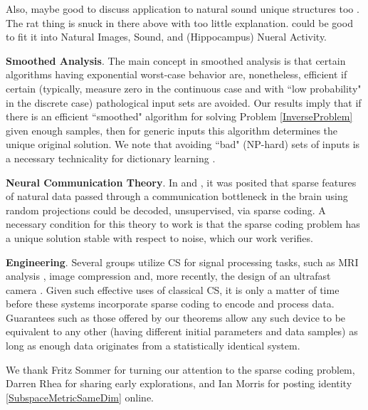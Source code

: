 \documentclass[journal, twocolumn]{IEEEtran}
\begin{document}
Also, maybe good to discuss application to natural sound unique structures too \cite{bellsejnowski1996, smithlewicki2006, Carlson12}.
The rat thing is snuck in there above with too little explanation.  could be good to fit it into Natural Images, Sound, and (Hippocampus) Nueral Activity.

\textbf{Smoothed Analysis}.
The main concept in smoothed analysis \cite{Spielman04} is that certain algorithms having exponential worst-case behavior are, nonetheless, efficient if certain (typically, measure zero in the continuous case and with ``low probability" in the discrete case) pathological input sets are avoided. Our results imply that if there is an efficient ``smoothed" algorithm for solving Problem \ref{InverseProblem} given enough samples, then for generic inputs this algorithm determines the unique original solution. We note that avoiding ``bad" (NP-hard) sets of inputs is a necessary technicality for dictionary learning \cite{Razaviyayn15, Tillmann15}.

\textbf{Neural Communication Theory}.
In \cite{Coulter10} and \cite{Isely10}, it was posited that sparse features of natural data passed through a communication bottleneck in the brain using random projections could be decoded, unsupervised, via sparse coding.  A necessary condition for this theory to work is that the sparse coding problem has a unique solution stable with respect to noise, which our work verifies. 

\textbf{Engineering}.
Several groups utilize CS for signal processing tasks, such as MRI analysis \cite{lustig2008compressed},  image compression \cite{Duarte08}  and, more recently, the design of an ultrafast camera \cite{Gao14}. Given such effective uses of classical CS, it is only a matter of time before these systems incorporate sparse coding to encode and process data. Guarantees such as those offered by our theorems allow any such device to be equivalent to any other (having different initial parameters and data samples) as long as enough data originates from a statistically identical system.


We thank Fritz Sommer for turning our attention to the sparse coding problem, Darren Rhea for sharing early explorations, and Ian Morris for posting identity \eqref{SubspaceMetricSameDim} online.  
\end{document}
